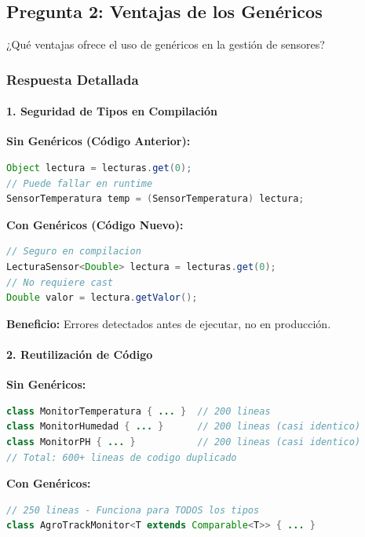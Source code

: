 \documentclass[12pt,a4paper]{article}
\begin{document}
\subsection{Pregunta 2: Ventajas de los Genéricos}

\begin{tcolorbox}[colback=yellow!10,colframe=orange,title=Pregunta]
¿Qué ventajas ofrece el uso de genéricos en la gestión de sensores?
\end{tcolorbox}

\subsubsection{Respuesta Detallada}

\paragraph{1. Seguridad de Tipos en Compilación}

\textbf{Sin Genéricos (Código Anterior):}
\begin{lstlisting}[language=Java]
Object lectura = lecturas.get(0);
// Puede fallar en runtime
SensorTemperatura temp = (SensorTemperatura) lectura;
\end{lstlisting}

\textbf{Con Genéricos (Código Nuevo):}
\begin{lstlisting}[language=Java]
// Seguro en compilacion
LecturaSensor<Double> lectura = lecturas.get(0);
// No requiere cast
Double valor = lectura.getValor();
\end{lstlisting}

\textbf{Beneficio:} Errores detectados antes de ejecutar, no en producción.

\paragraph{2. Reutilización de Código}

\textbf{Sin Genéricos:}
\begin{lstlisting}[language=Java]
class MonitorTemperatura { ... }  // 200 lineas
class MonitorHumedad { ... }      // 200 lineas (casi identico)
class MonitorPH { ... }           // 200 lineas (casi identico)
// Total: 600+ lineas de codigo duplicado
\end{lstlisting}

\textbf{Con Genéricos:}
\begin{lstlisting}[language=Java]
// 250 lineas - Funciona para TODOS los tipos
class AgroTrackMonitor<T extends Comparable<T>> { ... }
\end{lstlisting}
\end{document}
